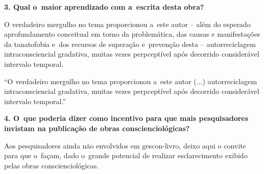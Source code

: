 \documentclass{gescons}
\begin{document}
\begin{multicols}{2}
\textbf{3. Qual o~maior aprendizado com a~escrita desta obra?}

O verdadeiro mergulho no tema proporcionou a~este autor -- além do
esperado aprofundamento conceitual em torno da problemática, das causas
e manifestações da tanatofobia e~dos recursos de superação e~prevenção
desta -- autorreciclagem intraconsciencial gradativa, muitas vezes
perpceptível após decorrido considerável intervalo temporal.

\begin{pullquote}
    ``O verdadeiro mergulho no tema proporcionou a~este autor  (...)  autorreciclagem intraconsciencial gradativa, muitas vezes perpceptível após decorrido considerável intervalo temporal.''
\end{pullquote}

\textbf{4. O~que poderia dizer como incentivo para que mais pesquisadores invistam na publicação de obras conscienciológicas?}

Aos pesquisadores ainda não envolvidos em gescon-livro, deixo aqui o
convite para que o~façam, dado o~grande potencial de realizar
esclarecimento exibido pelas obras conscienciológicas.


    \end{multicols}
\end{document}
